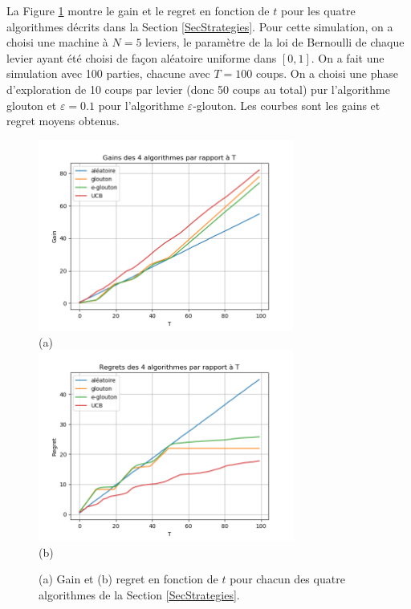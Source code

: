 \documentclass[a4paper,11pt]{article}
\begin{document}
La Figure \ref{FigResultsTemps} montre le gain et le regret en fonction de $t$ pour les quatre algorithmes décrits dans la Section \ref{SecStrategies}. Pour cette simulation, on a choisi une machine à $N = 5$ leviers, le paramètre de la loi de Bernoulli de chaque levier ayant été choisi de façon aléatoire uniforme dans $[0, 1]$. On a fait une simulation avec 100 parties, chacune avec $T = 100$ coups. On a choisi une phase d'exploration de 10 coups par levier (donc 50 coups au total) pur l'algorithme glouton et $\varepsilon = 0.1$ pour l'algorithme $\varepsilon$-glouton. Les courbes sont les gains et regret moyens obtenus.

\begin{figure}[ht]
\centering
\includegraphics[width=0.75\textwidth]{Gain_T} \\
(a) \\
\includegraphics[width=0.75\textwidth]{Regret_T} \\
(b)
\caption{(a) Gain et (b) regret en fonction de $t$ pour chacun des quatre algorithmes de la Section \ref{SecStrategies}.}
\label{FigResultsTemps}
\end{figure}
\end{document}

